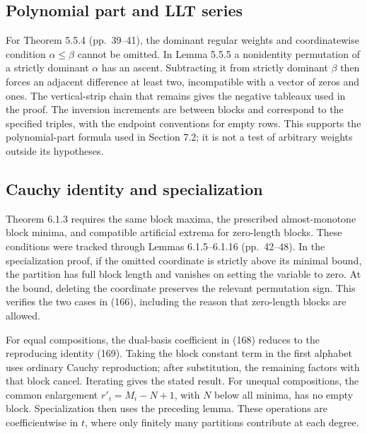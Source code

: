 \documentclass[10pt]{article}
\begin{document}
\subsection*{Polynomial part and LLT series}
For Theorem 5.5.4 (pp. 39–41), the dominant regular weights and coordinatewise condition \(\alpha\leq\beta\) cannot be omitted. In Lemma 5.5.5 a nonidentity permutation of a strictly dominant \(\alpha\) has an ascent. Subtracting it from strictly dominant \(\beta\) then forces an adjacent difference at least two, incompatible with a vector of zeros and ones. The vertical-strip chain that remains gives the negative tableaux used in the proof. The inversion increments are between blocks and correspond to the specified triples, with the endpoint conventions for empty rows. This supports the polynomial-part formula used in Section 7.2; it is not a test of arbitrary weights outside its hypotheses.\par
\subsection*{Cauchy identity and specialization}
Theorem 6.1.3 requires the same block maxima, the prescribed almost-monotone block minima, and compatible artificial extrema for zero-length blocks. These conditions were tracked through Lemmas 6.1.5–6.1.16 (pp. 42–48). In the specialization proof, if the omitted coordinate is strictly above its minimal bound, the partition has full block length and vanishes on setting the variable to zero. At the bound, deleting the coordinate preserves the relevant permutation sign. This verifies the two cases in (166), including the reason that zero-length blocks are allowed.\par
For equal compositions, the dual-basis coefficient in (168) reduces to the reproducing identity (169). Taking the block constant term in the first alphabet uses ordinary Cauchy reproduction; after substitution, the remaining factors with that block cancel. Iterating gives the stated result. For unequal compositions, the common enlargement \(r'_i=M_i-N+1\), with \(N\) below all minima, has no empty block. Specialization then uses the preceding lemma. These operations are coefficientwise in \(t\), where only finitely many partitions contribute at each degree.\par
\end{document}
